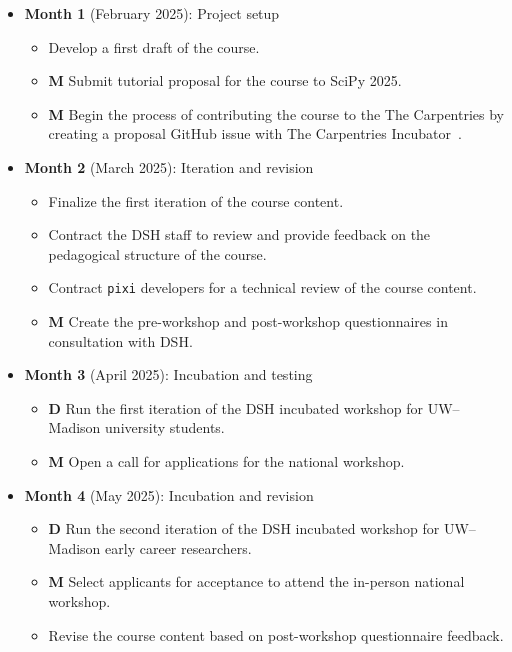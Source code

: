 \documentclass[letterpaper, 11pt]{article}
\newcommand{\institute}{UW--Madison}
\newcommand{\pixi}{\texttt{pixi}}
\newcommand{\milestone}{\textbf{\textrm{M}}}
\newcommand{\deliverable}{\textbf{\textrm{D}}}
\begin{document}
\begin{itemize}
  \item \textbf{Month 1} (February 2025): Project setup
    \begin{itemize}
      \item Develop a first draft of the course.
      \item \milestone{} Submit tutorial proposal for the course to SciPy 2025.
      \item \milestone{} Begin the process of contributing the course to the The Carpentries by creating a proposal GitHub issue with The Carpentries Incubator~\cite{carpentries_incubator_proposals}.
    \end{itemize}
  \item \textbf{Month 2} (March 2025): Iteration and revision
    \begin{itemize}
      \item Finalize the first iteration of the course content.
      \item Contract the DSH staff to review and provide feedback on the pedagogical structure of the course.
      \item Contract \pixi{} developers for a technical review of the course content.
      \item \milestone{} Create the pre-workshop and post-workshop questionnaires in consultation with DSH.
    \end{itemize}
  \item \textbf{Month 3} (April 2025): Incubation and testing
    \begin{itemize}
      \item \deliverable{} Run the first iteration of the DSH incubated workshop for \institute{} university students.
      \item \milestone{} Open a call for applications for the national workshop.
    \end{itemize}
  \item \textbf{Month 4} (May 2025): Incubation and revision
    \begin{itemize}
      \item \deliverable{} Run the second iteration of the DSH incubated workshop for \institute{} early career researchers.
      \item \milestone{} Select applicants for acceptance to attend the in-person national workshop.
      \item Revise the course content based on post-workshop questionnaire feedback.
    \end{itemize}

\end{itemize}
\end{document}
